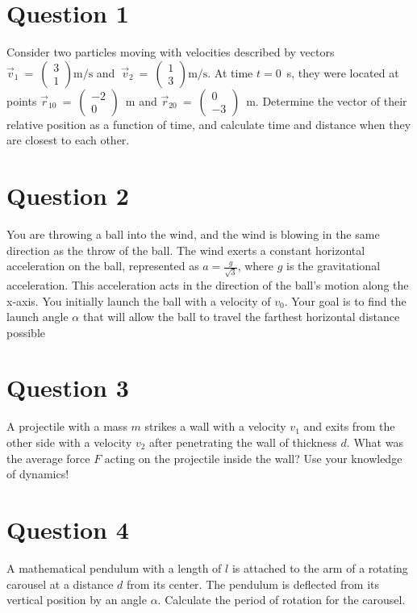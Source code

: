 \documentclass[a4paper,12pt]{article}
\begin{document}
\maketitle
\vspace{-1.5em}

\begin{center}
\end{center}

\vspace*{1cm}


\section*{Question 1}
Consider two particles moving with velocities described by vectors $\vec v_{1}~=~\begin{pmatrix} 3 \\ 1 \end{pmatrix}\text{m/s}$ and $~\vec v_{2}~=~\begin{pmatrix} 1 \\ 3 \end{pmatrix}\text{m/s.}$ At time $t = 0$~s, they were located at points $\vec r_{10}~=~\begin{pmatrix} -2 \\ 0 \end{pmatrix}$~m and $\vec r_{20}~=~\begin{pmatrix} 0 \\ -3 \end{pmatrix}$~m. Determine the vector of their relative position as a function of time, and calculate time and distance when they are closest to each other.
\section*{Question 2}
You are throwing a ball into the wind, and the wind is blowing in the same direction as the throw of the ball. The wind exerts a constant horizontal acceleration on the ball, represented as $a=\frac{g}{\sqrt{3}}$, where $g$ is the gravitational acceleration. This acceleration acts in the direction of the ball's motion along the x-axis. You initially launch the ball with a velocity of $v_0$. Your goal is to find the launch angle $\alpha$ that will allow the ball to travel the farthest horizontal distance possible

\section*{Question 3}
A projectile with a mass $m$ strikes a wall with a velocity $v_1$ and exits from the other side with a velocity $v_2$ after penetrating the wall of thickness $d$. What was the average force $F$ acting on the projectile inside the wall? Use your knowledge of dynamics!

\section*{Question 4}
A mathematical pendulum with a length of $l$ is attached to the arm of a rotating carousel at a distance $d$ from its center. The pendulum is deflected from its vertical position by an angle $\alpha$. Calculate the period of rotation for the carousel. 
\end{document}
